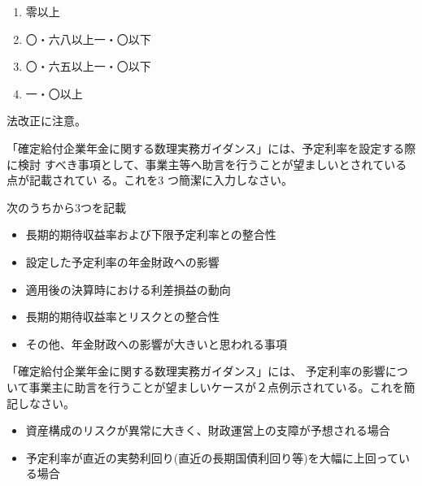 \begin{answerbox}
    \begin{enumerate}[A: ]
    \item 零以上
    \item 〇・六八以上一・〇以下
    \item 〇・六五以上一・〇以下
    \item 一・〇以上
  \end{enumerate}
\end{answerbox}



\begin{explanationbox}
  法改正に注意。
\end{explanationbox}


\begin{shortanswer}[年金2 2022 問題2(4)]
  「確定給付企業年金に関する数理実務ガイダンス」には、予定利率を設定する際に検討
すべき事項として、事業主等へ助言を行うことが望ましいとされている点が記載されてい
る。これを3 つ簡潔に入力しなさい。
\end{shortanswer}

\begin{answerbox}
  次のうちから3つを記載
  \begin{itemize}
    \item 長期的期待収益率および下限予定利率との整合性
    \item 設定した予定利率の年金財政への影響
    \item 適用後の決算時における利差損益の動向
    \item 長期的期待収益率とリスクとの整合性
    \item その他、年金財政への影響が大きいと思われる事項
  \end{itemize}
\end{answerbox}

\begin{shortanswer}[自作 2026/11/7]
  「確定給付企業年金に関する数理実務ガイダンス」には、
  予定利率の影響について事業主に助言を行うことが望ましいケースが２点例示されている。これを簡記しなさい。
\end{shortanswer}

\begin{answerbox}
  \begin{itemize}
    \item 資産構成のリスクが異常に大きく、財政運営上の支障が予想される場合
    
    \item 予定利率が直近の実勢利回り(直近の長期国債利回り等)を大幅に上回っている場合
  \end{itemize}
\end{answerbox}

